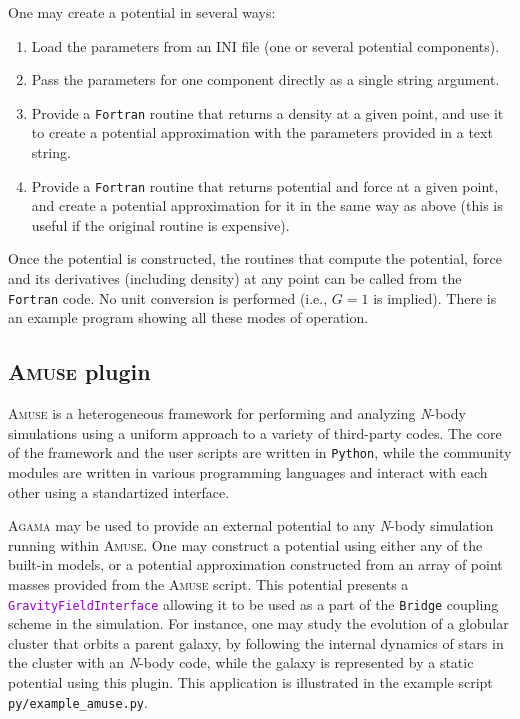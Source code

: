 \documentclass[12pt]{article}
\newcommand{\Agama}{\textsc{Agama}\xspace}
\newcommand{\Amuse}{\textsc{Amuse}\xspace}
\newcommand{\Nbody}{\textsl{N}-body\xspace}
\newcommand{\Python}{\texttt{Python}\xspace}
\newcommand{\Fortran}{\texttt{Fortran}\xspace}
\newcommand{\ttt}[1]{\textcolor{darkviolet}{\texttt{#1}}}
\begin{document}
One may create a potential in several ways:
\begin{enumerate}  \setlength{\parskip}{2pt} \setlength{\itemsep}{2pt}
\item Load the parameters from an INI file (one or several potential components).
\item Pass the parameters for one component directly as a single string argument.
\item Provide a \Fortran routine that returns a density at a given point, and use it to create a potential approximation with the parameters provided in a text string.
\item Provide a \Fortran routine that returns potential and force at a given point, and create a potential approximation for it in the same way as above (this is useful if the original routine is expensive).
\end{enumerate}
Once the potential is constructed, the routines that compute the potential, force and its derivatives (including density) at any point can be called from the \Fortran code. No unit conversion is performed (i.e., $G=1$ is implied).
There is an example program showing all these modes of operation.


\subsection{\Amuse plugin}  \label{sec:Amuse}

\Amuse \cite{PortegiesZwart2013} is a heterogeneous framework for performing and analyzing \Nbody simulations using a uniform approach to a variety of third-party codes. The core of the framework and the user scripts are written in \Python, while the community modules are written in various programming languages and interact with each other using a standartized interface.

\Agama may be used to provide an external potential to any \Nbody simulation running within \Amuse. One may construct a potential using either any of the built-in models, or a potential approximation constructed from an array of point masses provided from the \Amuse script. This potential presents a \ttt{GravityFieldInterface} allowing it to be used as a part of the \texttt{Bridge} coupling scheme in the simulation. For instance, one may study the evolution of a globular cluster that orbits a parent galaxy, by following the internal dynamics of stars in the cluster with an \Nbody code, while the galaxy is represented by a static potential using this plugin. This application is illustrated in the example script \texttt{py/example_amuse.py}.
\end{document}
